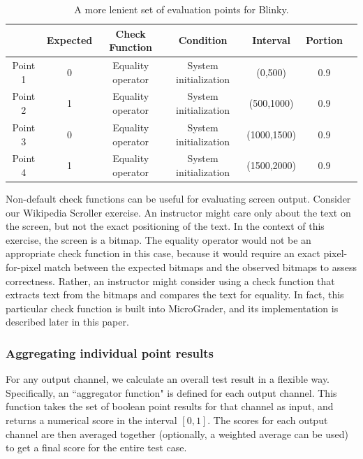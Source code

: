 \documentclass[12pt]{article}
\begin{document}
\begin{table}[ht]
\begin{center}
\caption{A more lenient set of evaluation points for Blinky.}
\label{table:blinky-lenient-points}
\begin{tabular}{c|cccccc}
& Expected & Check Function & Condition & Interval & Portion \\ \hline
Point 1 & 0 & Equality operator & System initialization & (0,500) & 0.9 \\
Point 2 & 1 & Equality operator & System initialization & (500,1000) & 0.9 \\
Point 3 & 0 & Equality operator & System initialization & (1000,1500) & 0.9 \\
Point 4 & 1 & Equality operator & System initialization & (1500,2000) & 0.9 \\ \hline
\end{tabular}
\end{center}
\end{table}

Non-default check functions can be useful for evaluating screen output.  Consider our Wikipedia Scroller exercise.  An instructor might care only about the text on the screen, but not the exact positioning of the text.  In the context of this exercise, the screen is a bitmap.  The equality operator would not be an appropriate check function in this case, because it would require an exact pixel-for-pixel match between the expected bitmaps and the observed bitmaps to assess correctness.  Rather, an instructor might consider using a check function that extracts text from the bitmaps and compares the text for equality.  In fact, this particular check function is built into MicroGrader, and its implementation is described later in this paper.

\subsubsection{Aggregating individual point results}
\label{sec:aggregating}
For any output channel, we calculate an overall test result in a flexible way.  Specifically, an ``aggregator function" is defined for each output channel.  This function takes the set of boolean point results for that channel as input, and returns a numerical score in the interval $[0,1]$.  The scores for each output channel are then averaged together (optionally, a weighted average can be used) to get a final score for the entire test case.
\end{document}
